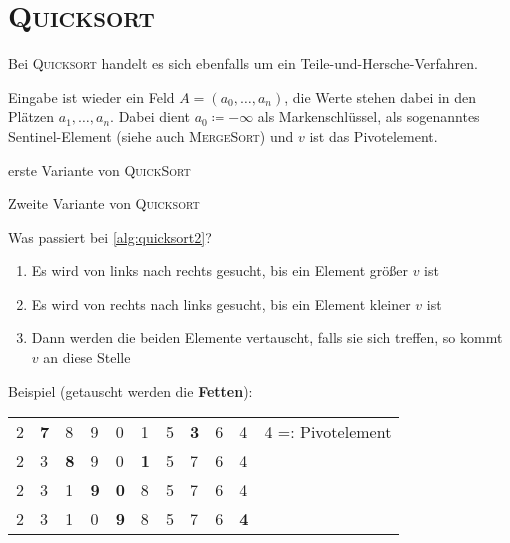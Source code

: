 \documentclass[ngerman,draft,parskip=half*,twoside]{scrreprt}
\theoremstyle{break}
\theoremstyle{nonumberbreak}
\begin{document}
\section{\textsc{Quicksort}}
Bei \textsc{Quicksort} handelt es sich ebenfalls um ein Teile-und-Hersche-Verfahren.

Eingabe ist wieder ein Feld $A=(a_0, \ldots, a_{n})$, die Werte stehen
dabei in den Plätzen $a_1, \ldots, a_{n}$.  Dabei dient $a_0\coloneqq
-\infty$ als Markenschlüssel, als sogenanntes Sentinel-Element (siehe
auch \textsc{MergeSort}) und $v$ ist das Pivotelement.

\begin{algorithm}
\caption{erste Variante von \textsc{QuickSort}}
\end{algorithm}

\begin{algorithm}
\caption{Zweite Variante von \textsc{Quicksort}}
\label{alg:quicksort2}
\end{algorithm}

Was passiert bei \autoref{alg:quicksort2}?
\begin{enumerate}
\item Es wird von links nach rechts gesucht, bis ein Element größer $v$ ist
\item Es wird von rechts nach links gesucht, bis ein Element kleiner $v$ ist
\item Dann werden die beiden Elemente vertauscht, falls sie sich treffen, so kommt $v$ an diese Stelle
\end{enumerate}

Beispiel (getauscht werden die \textbf{Fetten}):

\begin{tabular}{lllllllllll}
2 & \textbf{7} & 8 & 9 & 0 & 1 & 5 & \textbf{3} & 6 & 4 & \hspace{15pt} 4 =: Pivotelement\\
2 & 3 & \textbf{8} & 9 & 0 & \textbf{1} & 5 & 7 & 6 & 4 &\\ 
2 & 3 & 1 & \textbf{9} & \textbf{0} & 8 & 5 & 7 & 6 & 4 &\\
2 & 3 & 1 & 0 & \textbf{9} & 8 & 5 & 7 & 6 & \textbf{4} &\\
\end{tabular}
\end{document}
